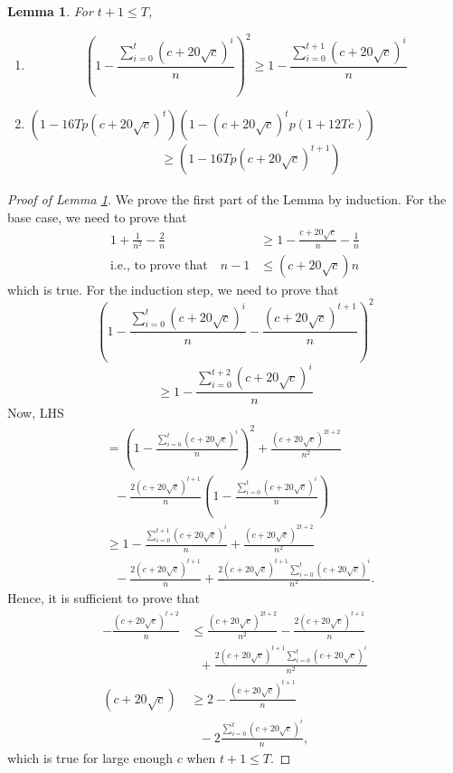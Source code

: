 \documentclass[11pt]{article}
\newtheorem{lemma}[theorem]{Lemma}
\begin{document}
\begin{lemma} \label{lemma:handler1}
For $t+1\leq T$,
\begin{enumerate}
\item
\[
\left(1-\frac{\sum_{i=0}^t (c+20\sqrt{c})^i}{n}\right)^{2} \geq 1-\frac{\sum_{i=0}^{t+1} (c+20\sqrt{c})^i}{n}
\]
\item $\left(1-16Tp(c+20\sqrt{c})^t\right)(1-(c+20\sqrt{c})^tp(1+12Tc))$
\begin{align*}
&\geq \left(1-16Tp(c+20\sqrt{c})^{t+1}\right)
\end{align*}
\end{enumerate}
\end{lemma}
\begin{proof} [Proof of Lemma \ref{lemma:handler1}]
We prove the first part of the Lemma by induction. For the base case, we need to prove that
\begin{align*}
1+\frac{1}{n^2}-\frac{2}{n}&\geq 1-\frac{c+20\sqrt{c}}{n}-\frac{1}{n}\\
\text{i.e., to prove that}\quad n-1&\leq (c+20\sqrt{c})n
\end{align*}
which is true.
For the induction step, we need to prove that
\[
\left(1-\frac{\sum_{i=0}^t(c+20\sqrt{c})^i}{n}-\frac{(c+20\sqrt{c})^{t+1}}{n}\right)^2
\]
\[
\geq 1-\frac{\sum_{i=0}^{t+2}(c+20\sqrt{c})^i}{n}
\]
Now, LHS
\begin{align*}
&= \left(1-\frac{\sum_{i=0}^{t}(c+20\sqrt{c})^i}{n}\right)^2 + \frac{(c+20\sqrt{c})^{2t+2}}{n^2}\\
&\ \ \ -\frac{2(c+20\sqrt{c})^{t+1}}{n}\left(1-\frac{\sum_{i=0}^{t}(c+20\sqrt{c})^i}{n}\right)\\
&\geq 1-\frac{\sum_{i=0}^{t+1} (c+20\sqrt{c})^i}{n} + \frac{(c+20\sqrt{c})^{2t+2}}{n^2}\\
&\ \ \ -\frac{2(c+20\sqrt{c})^{t+1}}{n}+\frac{2(c+20\sqrt{c})^{t+1}\sum_{i=0}^{t}(c+20\sqrt{c})^i}{n^2}.
\end{align*}
Hence, it is sufficient to prove that
\begin{align*}
-\frac{(c+20\sqrt{c})^{t+2}}{n} &\leq \frac{(c+20\sqrt{c})^{2t+2}}{n^2}-\frac{2(c+20\sqrt{c})^{t+1}}{n}\\
&\ \ \ +\frac{2(c+20\sqrt{c})^{t+1}\sum_{i=0}^{t}(c+20\sqrt{c})^i}{n^2} \\
(c+20\sqrt{c}) &\geq 2 - \frac{(c+20\sqrt{c})^{t+1}}{n}\\
&\ \ \ - 2\frac{\sum_{i=0}^{t}(c+20\sqrt{c})^i}{n},
\end{align*}
which is true for large enough $c$ when $t+1\leq T$.


\end{proof}
\end{document}

